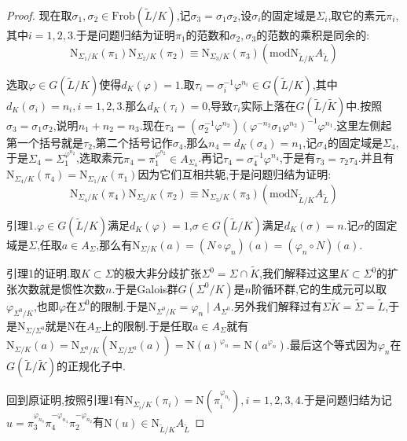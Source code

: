 \begin{enumerate}
\begin{proof}
    	现在取$\sigma_1,\sigma_2\in\mathrm{Frob}(\widetilde{L}/K)$,记$\sigma_3=\sigma_1\sigma_2$,设$\sigma_i$的固定域是$\Sigma_i$,取它的素元$\pi_i$,其中$i=1,2,3$.于是问题归结为证明$\pi_1$的范数和$\sigma_2,\sigma_3$的范数的乘积是同余的:
    	$$\mathrm{N}_{\Sigma_1/K}(\pi_1)\mathrm{N}_{\Sigma_2/K}(\pi_2)\equiv\mathrm{N}_{\Sigma_3/K}(\pi_3)(\mathrm{mod}\mathrm{N}_{\widetilde{L}/K}A_{\widetilde{L}})$$
    	
    	选取$\varphi\in G(\widetilde{L}/K)$使得$d_K(\varphi)=1$.取$\tau_i=\sigma_i^{-1}\varphi^{n_i}\in G(\widetilde{L}/K)$,其中$d_K(\sigma_i)=n_i,i=1,2,3$.那么$d_K(\tau_i)=0$,导致$\tau_i$实际上落在$G(\widetilde{L}/\widetilde{K})$中.按照$\sigma_3=\sigma_1\sigma_2$,说明$n_1+n_2=n_3$.现在$\tau_3=(\sigma_2^{-1}\varphi^{n_2})(\varphi^{-n_2}\sigma_1\varphi^{n_2})^{-1}\varphi^{n_1}$.这里左侧起第一个括号就是$\tau_2$,第二个括号记作$\sigma_4$,那么$n_4=d_K(\sigma_4)=n_1$,记$\sigma_4$的固定域是$\Sigma_4$,于是$\Sigma_4=\Sigma_1^{\varphi^{n_2}}$,选取素元$\pi_4=\pi_1^{\varphi^{n_2}}\in A_{\Sigma_4}$.再记$\tau_4=\sigma_4^{-1}\varphi^{n_4}$,于是有$\tau_3=\tau_2\tau_4$.并且有$\mathrm{N}_{\Sigma_4/K}(\pi_4)=\mathrm{N}_{\Sigma_1/K}(\pi_1)$因为它们互相共轭,于是问题归结为证明:
    	$$\mathrm{N}_{\Sigma_4/K}(\pi_4)\mathrm{N}_{\Sigma_2/K}(\pi_2)\equiv\mathrm{N}_{\Sigma_3/K}(\pi_3)(\mathrm{mod}\mathrm{N}_{\widetilde{L}/K}A_{\widetilde{L}})$$
    	
    	引理1.$\varphi\in G(\widetilde{L}/K)$满足$d_K(\varphi)=1$,$\sigma\in G(\widetilde{L}/K)$满足$d_K(\sigma)=n$.记$\sigma$的固定域是$\Sigma$,任取$a\in A_{\Sigma}$,那么有$\mathrm{N}_{\Sigma/K}(a)=(N\circ\varphi_n)(a)=(\varphi_n\circ N)(a)$.
    	
    	引理1的证明.取$K\subset\Sigma$的极大非分歧扩张$\Sigma^0=\Sigma\cap\widetilde{K}$,我们解释过这里$K\subset\Sigma^0$的扩张次数就是惯性次数$n$.于是Galois群$G(\Sigma^0/K)$是$n$阶循环群,它的生成元可以取$\varphi_{\Sigma^0/K}$,也即$\varphi$在$\Sigma^0$的限制.于是$\mathrm{N}_{\Sigma^0/K}=\varphi_n\mid A_{\Sigma^0}$.另外我们解释过有$\Sigma\widetilde{K}=\widetilde{\Sigma}=\widetilde{L}$,于是$\mathrm{N}_{\Sigma/\Sigma^0}$就是$\mathrm{N}$在$A_{\Sigma}$上的限制.于是任取$a\in A_{\Sigma}$就有$\mathrm{N}_{\Sigma/K}(a)=\mathrm{N}_{\Sigma^0/K}(\mathrm{N}_{\Sigma/\Sigma^0}(a))=\mathrm{N}(a)^{\varphi_n}=\mathrm{N}(a^{\varphi_n})$.最后这个等式因为$\varphi_n$在$G(\widetilde{L}/\widetilde{K})$的正规化子中.
    	
    	回到原证明,按照引理1有$\mathrm{N}_{\Sigma_i/K}(\pi_i)=\mathrm{N}(\pi_i^{\varphi_{n_i}}),i=1,2,3,4$.于是问题归结为记$u=\pi_3^{\varphi_{n_3}}\pi_4^{-\varphi_{n_4}}\pi_2^{-\varphi_{n_2}}$有$\mathrm{N}(u)\in\mathrm{N}_{\widetilde{L}/K}A_{\widetilde{L}}$
    	

\end{proof}
\end{enumerate}
